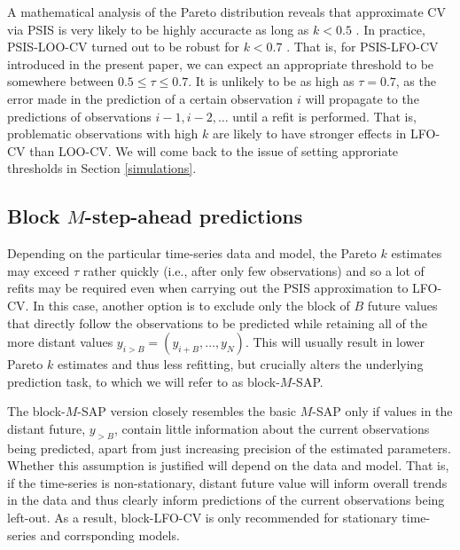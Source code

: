 \documentclass[american,]{article}
\begin{document}
A mathematical analysis of the Pareto distribution reveals that
approximate CV via PSIS is very likely to be highly accuracte as long as
\(k < 0.5\) \citep{vehtari2017psis}. In practice, PSIS-LOO-CV turned out
to be robust for \(k < 0.7\) \citep{vehtari2017loo}. That is, for
PSIS-LFO-CV introduced in the present paper, we can expect an
appropriate threshold to be somewhere between
\(0.5 \leq \tau \leq 0.7\). It is unlikely to be as high as
\(\tau = 0.7\), as the error made in the prediction of a certain
observation \(i\) will propagate to the predictions of observations
\(i-1, i-2, \ldots\) until a refit is performed. That is, problematic
observations with high \(k\) are likely to have stronger effects in
LFO-CV than LOO-CV. We will come back to the issue of setting approriate
thresholds in Section \ref{simulations}.

\hypertarget{block-m-step-ahead-predictions}{%
\subsection{\texorpdfstring{Block \(M\)-step-ahead
predictions}{Block M-step-ahead predictions}}\label{block-m-step-ahead-predictions}}

Depending on the particular time-series data and model, the Pareto \(k\)
estimates may exceed \(\tau\) rather quickly (i.e., after only few
observations) and so a lot of refits may be required even when carrying
out the PSIS approximation to LFO-CV. In this case, another option is to
exclude only the block of \(B\) future values that directly follow the
observations to be predicted while retaining all of the more distant
values \(y_{i>B} = (y_{i + B}, \ldots, y_N)\). This will usually result
in lower Pareto \(k\) estimates and thus less refitting, but crucially
alters the underlying prediction task, to which we will refer to as
block-\(M\)-SAP.

The block-\(M\)-SAP version closely resembles the basic \(M\)-SAP only
if values in the distant future, \(y_{>B}\), contain little information
about the current observations being predicted, apart from just
increasing precision of the estimated parameters. Whether this
assumption is justified will depend on the data and model. That is, if
the time-series is non-stationary, distant future value will inform
overall trends in the data and thus clearly inform predictions of the
current observations being left-out. As a result, block-LFO-CV is only
recommended for stationary time-series and corrsponding models.
\end{document}
